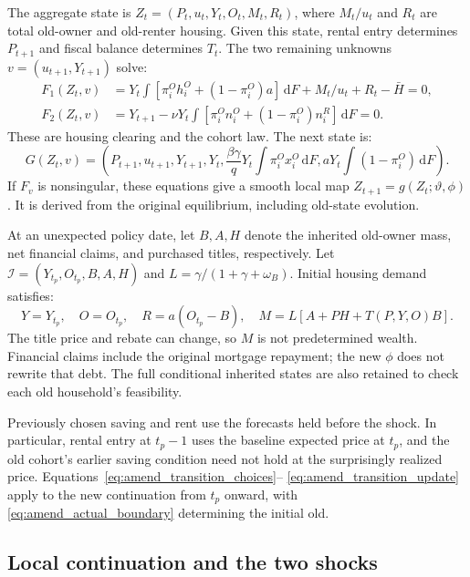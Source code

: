 \documentclass[11pt]{article}
\newcommand{\dd}{\mathrm d}
\begin{document}
The aggregate state is $Z_t=(P_t,u_t,Y_t,O_t,M_t,R_t)$, where
$M_t/u_t$ and $R_t$ are total old-owner and old-renter housing.
Given this state, rental entry determines $P_{t+1}$ and fiscal balance
determines $T_t$. The two remaining unknowns
$v=(u_{t+1},Y_{t+1})$ solve:
\begin{align}
 F_1(Z_t,v)&=Y_t\int[\pi_i^Oh_i^O+(1-\pi_i^O)a]\,\dd F
              +M_t/u_t+R_t-\bar H=0,\nonumber\\
 F_2(Z_t,v)&=Y_{t+1}-\nu Y_t
              \int[\pi_i^On_i^O+(1-\pi_i^O)n_i^R]\,\dd F=0.
 \label{eq:amend_transition_residuals}
\end{align}
These are housing clearing and the cohort law. The next state is:
\begin{equation}
 G(Z_t,v)=\left(
 P_{t+1},u_{t+1},Y_{t+1},Y_t,
 \frac{\beta\gamma}{q}Y_t\int\pi_i^Ox_i^O\,\dd F,
 aY_t\int(1-\pi_i^O)\,\dd F\right).
 \label{eq:amend_transition_update}
\end{equation}
If $F_v$ is nonsingular, these equations give a smooth local map
$Z_{t+1}=g(Z_t;\vartheta,\phi)$. It is derived from the original equilibrium,
including old-state evolution.

At an unexpected policy date, let $B,A,H$ denote the inherited old-owner
mass, net financial claims, and purchased titles, respectively. Let
$\mathcal I=(Y_{t_p},O_{t_p},B,A,H)$ and
$L=\gamma/(1+\gamma+\omega_B)$. Initial housing demand satisfies:
\begin{equation}
 Y=Y_{t_p},\quad O=O_{t_p},\quad R=a(O_{t_p}-B),\quad
 M=L[A+PH+T(P,Y,O)B].
 \label{eq:amend_actual_boundary}
\end{equation}
The title price and rebate can change, so $M$ is not predetermined wealth.
Financial claims include the original mortgage repayment; the new $\phi$
does not rewrite that debt. The full conditional inherited states are also
retained to check each old household's feasibility.

Previously chosen saving and rent use the forecasts held before the shock.
In particular, rental entry at $t_p-1$ uses the baseline expected price at
$t_p$, and the old cohort's earlier saving condition need not hold at the
surprisingly realized price. Equations~\eqref{eq:amend_transition_choices}--
\eqref{eq:amend_transition_update} apply to the new continuation from $t_p$
onward, with \eqref{eq:amend_actual_boundary} determining the initial old.

\subsection{Local continuation and the two shocks}
\end{document}
